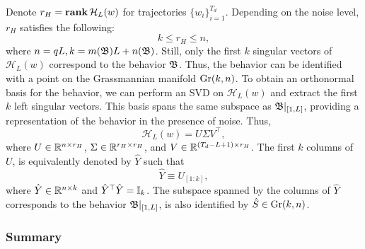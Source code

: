 Denote $r_H = \mathbf{rank} \, \mathcal{H}_L(w)$ for trajectories ${\{w_i\}}_{i=1}^{T_d}$. Depending on the noise level, $r_H$ satisfies the following:
\begin{equation}
  k \leq r_H \leq n,
\end{equation}
where $n = qL, k = m(\mathfrak{B})L + n(\mathfrak{B})$. Still, only the first $k$ singular vectors of $\mathcal{H}_L(w)$ correspond to the behavior $\mathfrak{B}$. Thus, the behavior can be identified with a point on the Grassmannian manifold $\text{Gr}(k, n)$. To obtain an orthonormal basis for the behavior, we can perform an SVD on $\mathcal{H}_L(w)$ and extract the first $k$ left singular vectors. This basis spans the same subspace as $\mathfrak{B}|_{[1,L]}$, providing a representation of the behavior in the presence of noise. Thus,
\begin{equation}
   \mathcal{H}_L(w) = U \Sigma V^\top,
\end{equation}
where $U \in \mathbb{R}^{n \times r_H}$, $\Sigma \in \mathbb{R}^{r_H \times r_H}$, and $V \in \mathbb{R}^{(T_d-L+1) \times r_H}$. The first $k$ columns of $U$, is equivalently denoted by $\hat{Y}$ such that
\begin{equation}
   \hat{Y} \equiv U_{[1:k]},
\end{equation}
where $\hat{Y} \in \mathbb{R}^{n \times k}$ and $\hat{Y}^\top \hat{Y} = \mathbb{I}_k$. The subspace spanned by the columns of $\hat{Y}$ corresponds to the behavior $\mathfrak{B}|_{[1,L]}$, is also identified by $\hat{S} \in \text{Gr}(k,n)$.

\subsubsection{Summary}
\begin{figure}[h]
   \centering
{}
\end{figure}




